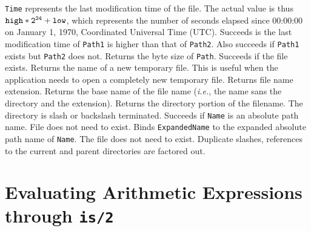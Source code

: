 \begin{description}
  {\tt Time} represents the last modification time of the file.
  The actual value is thus $\tt high*2^{24} + low$, which represents the
  number of seconds elapsed since 00:00:00 on
       January 1, 1970, Coordinated Universal Time (UTC).
  Succeeds is the last modification time of {\tt Path1} is higher than that
  of {\tt Path2}. Also succeeds if {\tt Path1} exists but {\tt Path2} does
  not.
  Returns the byte size of {\tt Path}.
  Succeeds if the file exists.
  Returns the name of a new temporary file. This is useful when the
  application needs to open a completely new temporary file.
  Returns file name extension.
  Returns the base name of the file name ({\it i.e.}, the name sans the
  directory and the extension).
  Returns the directory portion of the filename. The directory is slash or
  backslash terminated.
  Succeeds if {\tt Name} is an absolute path name. File does not need to exist.
  Binds {\tt ExpandedName} to the expanded absolute path name of {\tt Name}.
  The file does not need to exist. Duplicate slashes, references to the
  current and parent directories are factored out.
\end{description}

\section{Evaluating Arithmetic Expressions through {\tt is/2}}
\label{Arithmetic} 


